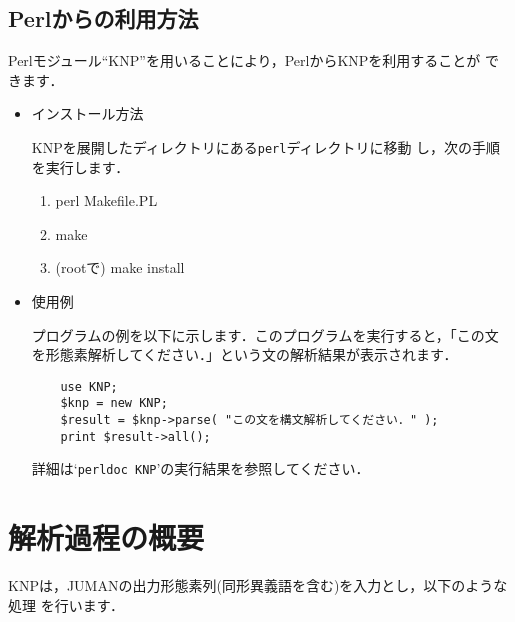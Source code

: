 \documentclass[a4j,11pt,titlepage]{jarticle}
\begin{document}
\subsection{Perlからの利用方法}

Perlモジュール``KNP''を用いることにより，PerlからKNPを利用することが
できます．

\begin{itemize}
 \item インストール方法

       KNPを展開したディレクトリにある\texttt{perl}ディレクトリに移動
       し，次の手順を実行します．
       \begin{enumerate}
	\item perl Makefile.PL
	\item make
	\item (rootで) make install
       \end{enumerate}
 \item 使用例

       プログラムの例を以下に示します．このプログラムを実行すると，「この文
       を形態素解析してください．」という文の解析結果が表示されます．

       \begin{verbatim}
	use KNP;
	$knp = new KNP;
	$result = $knp->parse( "この文を構文解析してください．" );
	print $result->all();
       \end{verbatim}

       詳細は`\texttt{perldoc KNP}'の実行結果を参照してください．
\end{itemize}


\section{解析過程の概要}

KNPは，JUMANの出力形態素列(同形異義語を含む)を入力とし，以下のような処理
を行います．
\end{document}
